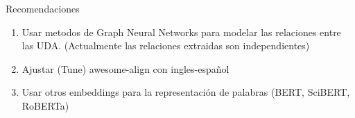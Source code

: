\begin{recomendations}
    Recomendaciones

    \begin{enumerate}
        \item Usar metodos de Graph Neural Networks para modelar las relaciones entre las UDA. (Actualmente las relaciones extraidas son independientes)
        \item Ajustar (Tune) awesome-align con ingles-español
        \item Usar otros embeddings para la representación de palabras (BERT, SciBERT, RoBERTa)
    \end{enumerate}
\end{recomendations}
